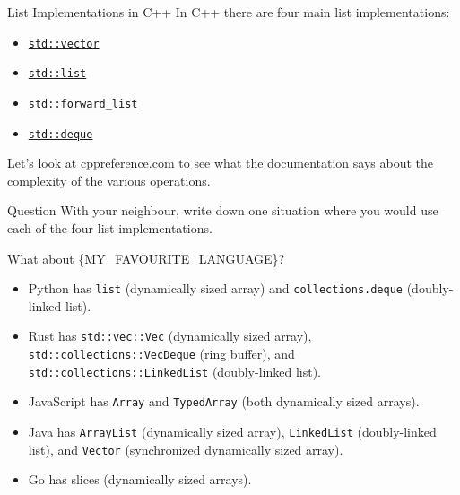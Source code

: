 \documentclass{algo}
\begin{document}
\begin{frame}{List Implementations in C++}
    In C++ there are four main list implementations:

    \begin{itemize}
        \item \href{https://en.cppreference.com/w/cpp/container/vector}{\texttt{std::vector}}
        \item \href{https://en.cppreference.com/w/cpp/container/list}{\texttt{std::list}}
        \item \href{https://en.cppreference.com/w/cpp/container/forward_list}{\texttt{std::forward\_list}}
        \item \href{https://en.cppreference.com/w/cpp/container/deque}{\texttt{std::deque}}
    \end{itemize}

    Let's look at cppreference.com to see what the documentation says about the
    complexity of the various operations.

    \pause

    \begin{block}{Question}
        With your neighbour, write down one situation where you would use each
        of the four list implementations.
    \end{block}
\end{frame}

\begin{frame}{What about \{MY\_FAVOURITE\_LANGUAGE\}?}
    \begin{itemize}
        \item Python has \texttt{list} (dynamically sized array) and
            \texttt{collections.deque} (doubly-linked list).
        \item Rust has \texttt{std::vec::Vec} (dynamically sized array),
            \texttt{std::collections::VecDeque} (ring buffer), and
            \texttt{std::collections::LinkedList} (doubly-linked list).
        \item JavaScript has \texttt{Array} and \texttt{TypedArray} (both
            dynamically sized arrays).
        \item Java has \texttt{ArrayList} (dynamically sized array),
            \texttt{LinkedList} (doubly-linked list), and
            \texttt{Vector} (synchronized dynamically sized array).
        \item Go has slices (dynamically sized arrays).
    \end{itemize}
\end{frame}
\end{document}

